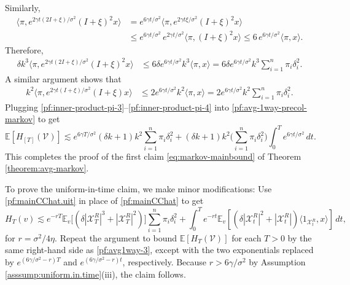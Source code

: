 \documentclass[11pt,reqno]{amsart}
\numberwithin{equation}{section}
\theoremstyle{definition}
\def\E{{\mathbb E}}
\def\V{{\mathcal V}}
\def\X{{\mathcal X}}
\begin{document}
		Similarly,
		\begin{align*}
			\big\langle \pi,  e^{2\gamma  t (2I+\xi)/\sigma^2}(I+\xi)^2 x \big\rangle
			&= e^{6\gamma t/\sigma^2}\big\langle \pi,  e^{2\gamma  t \xi/\sigma^2}(I+\xi)^2 x \big\rangle \\
			&\le e^{6\gamma t/\sigma^2}\,e^{2\gamma t/\sigma^2}\big\langle \pi,  (I+\xi)^2 x \big\rangle
			\le 6\,e^{6\gamma t/\sigma^2}\langle \pi, x\rangle.
		\end{align*}
		Therefore, 
	\begin{align} \label{pf:inner-product-pi-3}
		\delta k^3 \big\langle \pi , e^{ 2\gamma  t (2I+\xi)/\sigma^2}(I+\xi)^2 x\big\rangle
		&\le 6\delta e^{6\gamma t/\sigma^2}k^3 \langle \pi, x\rangle
		= 6\delta e^{6\gamma t/\sigma^2} k^3  \sum_{i=1}^n \pi_i\delta_i^2.
	\end{align}
	A similar argument shows that
	\begin{align} \label{pf:inner-product-pi-4}
		k^2 \big\langle \pi,  e^{2\gamma  t (I+\xi)/\sigma^2}(I+\xi) x \big\rangle
		&\le 2e^{6\gamma t/\sigma^2}k^2 \langle \pi, x\rangle
		= 2e^{6\gamma t/\sigma^2}k^2\sum_{i=1}^n \pi_i \delta_i^2.
	\end{align}
	Plugging \eqref{pf:inner-product-pi-3}--\eqref{pf:inner-product-pi-4} into \eqref{pf:avg-1way-precol-markov} to get
	\begin{equation} 
		\E[H_{[T]}(\V)]
		\lesssim  e^{6\gamma T/\sigma^2} (\delta k + 1) k^2   \sum_{i=1}^n \pi_i \delta_i^2
		+ (\delta k + 1)k^2 \bigg( \sum_{i=1}^n \pi_i \delta_i^2\bigg) \int_0^T e^{6\gamma t/\sigma^2} \,dt.
		\label{pf:avg1way-3}
	\end{equation}
	This completes the proof of the first claim \eqref{eq:markov-mainbound} of Theorem \ref{theorem:avg-markov}.
	
To prove the uniform-in-time claim, we make minor modifications: Use \eqref{pf:mainCChat.uit} in place of \eqref{pf:mainCChat} to get
\begin{equation*}
	H_T(v)  \lesssim e^{-rT} \E_v\Big[(\delta |\X_T^{R}|^3 + |\X_T^{R}|^2) \Big] \sum_{i=1}^n \pi_i\delta_i^2 + \int_0^T e^{-rt}\E_v[(\delta|\X_t^{R}|^2+|\X_t^{R}|)\langle 1_{\X_t^{R}},x\rangle]\,dt,
\end{equation*}
for $r=\sigma^2/4\eta$. Repeat the argument to bound $\E[H_T(\V)]$ for each $T>0$ by the same right-hand side as \eqref{pf:avg1way-3}, except with the two exponentials replaced by $e^{(6\gamma/\sigma^2 -r)T}$ and $e^{(6\gamma/\sigma^2 -r)t}$, respectively. Because $r > 6\gamma/\sigma^2$ by Assumption \ref{asssump:uniform.in.time}(iii), the claim follows.
\hfill \qedsymbol
\end{document}
